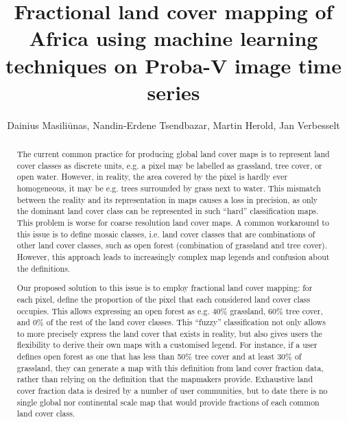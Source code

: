 \documentclass[a4paper,10pt]{article}
\title{Fractional land cover mapping of Africa using machine learning techniques on Proba-V image time series}
\author{Dainius Masiliūnas, Nandin-Erdene Tsendbazar, Martin Herold, Jan Verbesselt}
\begin{document}
\maketitle

\begin{abstract}

The current common practice for producing global land cover maps is to represent land cover classes as discrete units, e.g. a pixel may be labelled as grassland, tree cover, or open water. However, in reality, the area covered by the pixel is hardly ever homogeneous, it may be e.g. trees surrounded by grass next to water. This mismatch between the reality and its representation in maps causes a loss in precision, as only the dominant land cover class can be represented in such ``hard'' classification maps. This problem is worse for coarse resolution land cover maps. A common workaround to this issue is to define mosaic classes, i.e. land cover classes that are combinations of other land cover classes, such as open forest (combination of grassland and tree cover). However, this approach leads to increasingly complex map legends and confusion about the definitions.

Our proposed solution to this issue is to employ fractional land cover mapping: for each pixel, define the proportion of the pixel that each considered land cover class occupies. This allows expressing an open forest as e.g. 40\% grassland, 60\% tree cover, and 0\% of the rest of the land cover classes. This ``fuzzy'' classification not only allows to more precisely express the land cover that exists in reality, but also gives users the flexibility to derive their own maps with a customised legend. For instance, if a user defines open forest as one that has less than 50\% tree cover and at least 30\% of grassland, they can generate a map with this definition from land cover fraction data, rather than relying on the definition that the mapmakers provide.
Exhaustive land cover fraction data is desired by a number of user communities, but to date there is no single global nor continental scale map that would provide fractions of each common land cover class.


\end{abstract}
\end{document}
